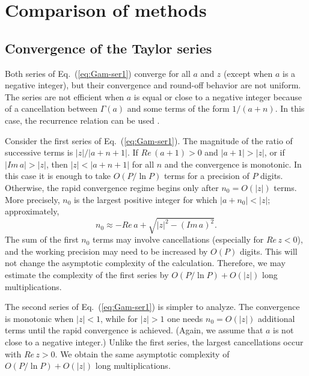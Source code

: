 \documentclass{llncs}
\begin{document}
\section{Comparison of methods}


\subsection{Convergence of the Taylor series}

Both series of Eq.~(\ref{eq:Gam-ser1}) converge for all $a$ and
$z$ (except when $a$ is a negative integer), but their convergence
and round-off behavior are not uniform. The series are not efficient
when $a$ is equal or close to a negative integer because of a cancellation
between $\Gamma \left(a\right)$ and some terms of the form $1/(a+n)$.
In this case, the recurrence relation can be used \cite{Gautschi99}.

Consider the first series of Eq.~(\ref{eq:Gam-ser1}). The magnitude
of the ratio of successive terms is $\left|z\right|/\left|a+n+1\right|$.
If $Re\, \left(a+1\right)>0$ and $\left|a+1\right|>\left|z\right|$,
or if $|Im\, a|>\left|z\right|$, then $\left|z\right|<\left|a+n+1\right|$
for all $n$ and the convergence is monotonic. In this case it is
enough to take $O\left(P/\ln P\right)$ terms for a precision of $P$
digits. Otherwise, the rapid convergence regime begins only after
$n_{0}=O\left(\left|z\right|\right)$ terms. More precisely, $n_{0}$
is the largest positive integer for which $\left|a+n_{0}\right|<\left|z\right|$;
approximately, \begin{equation}
n_{0}\approx -Re\, a+\sqrt{\left|z\right|^{2}-\left(Im\, a\right)^{2}}.\label{eq:n01est}\end{equation}
 The sum of the first $n_{0}$ terms may involve cancellations (especially
for $Re\, z<0$), and the working precision may need to be increased
by $O\left(P\right)$ digits. This will not change the asymptotic
complexity of the calculation. Therefore, we may estimate the complexity
of the first series by $O\left(P/\ln P\right)+O\left(\left|z\right|\right)$
long multiplications.

The second series of Eq.~(\ref{eq:Gam-ser1}) is simpler to analyze.
The convergence is monotonic when $\left|z\right|<1$, while for $\left|z\right|>1$
one needs $n_{0}=O\left(\left|z\right|\right)$ additional terms until
the rapid convergence is achieved. (Again, we assume that $a$ is
not close to a negative integer.) Unlike the first series, the largest
cancellations occur with $Re\, z>0$. We obtain the same asymptotic
complexity of $O\left(P/\ln P\right)+O\left(\left|z\right|\right)$
long multiplications.
\end{document}
